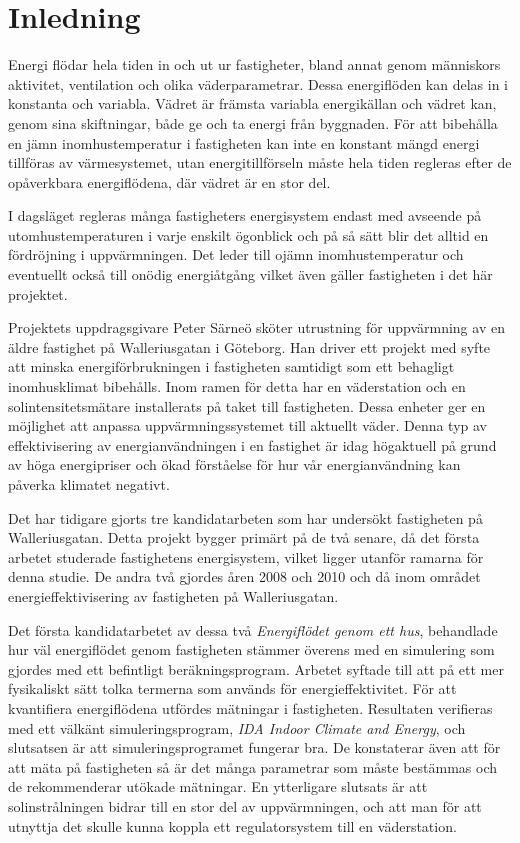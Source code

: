 \chapter{Inledning}

Energi flödar hela tiden in och ut ur fastigheter, bland annat genom människors aktivitet, ventilation och olika väderparametrar. Dessa energiflöden kan delas in i konstanta och variabla. Vädret är främsta variabla energikällan och vädret kan, genom sina skiftningar, både ge och ta energi från byggnaden. För att bibehålla en jämn inomhustemperatur i fastigheten kan inte en konstant mängd energi tillföras av värmesystemet, utan energitillförseln måste hela tiden regleras efter de opåverkbara energiflödena, där vädret är en stor del.

I dagsläget regleras många fastigheters energisystem endast med avseende på utomhustemperaturen i varje enskilt ögonblick och på så sätt blir det alltid en fördröjning i uppvärmningen. Det leder till ojämn inomhustemperatur och eventuellt också till onödig energiåtgång vilket även gäller fastigheten i det här projektet.

Projektets uppdragsgivare Peter Särneö sköter utrustning för uppvärmning av en äldre fastighet på Walleriusgatan i Göteborg. Han driver ett projekt med syfte att minska energiförbrukningen i fastigheten samtidigt som ett behagligt inomhusklimat bibehålls. Inom ramen för detta har en väderstation och en solintensitetsmätare installerats på taket till fastigheten. Dessa enheter ger en möjlighet att anpassa uppvärmningssystemet till aktuellt  väder. Denna typ av effektivisering av energianvändningen i en fastighet är idag högaktuell på grund av höga energipriser och ökad förståelse för hur vår energianvändning kan påverka klimatet negativt.

Det har tidigare gjorts tre kandidatarbeten som har undersökt fastigheten på Walleriusgatan. Detta projekt bygger primärt på de två senare, då det första arbetet studerade fastighetens energisystem, vilket ligger utanför ramarna för denna studie. De andra två gjordes åren 2008 och 2010 och då inom området energieffektivisering av fastigheten på Walleriusgatan. 

Det första kandidatarbetet av dessa två \textit{Energiflödet genom ett hus}\cite{kandidatarbete2008},
behandlade hur väl energiflödet genom fastigheten stämmer
överens med en simulering som gjordes med ett befintligt beräkningsprogram. Arbetet syftade
till att på ett mer fysikaliskt sätt tolka termerna som används för
energieffektivitet. För att kvantifiera energiflödena utfördes mätningar i
fastigheten. Resultaten verifieras med ett välkänt simuleringsprogram,
\emph{IDA Indoor Climate and Energy}, och slutsatsen är att simuleringsprogramet fungerar bra.
De konstaterar även att för att mäta på fastigheten så är det många parametrar som
måste bestämmas och de rekommenderar utökade mätningar.
 En ytterligare slutsats är att solinstrålningen bidrar till en stor del av
uppvärmningen, och att man för att utnyttja det skulle kunna koppla ett
regulatorsystem till en väderstation.

